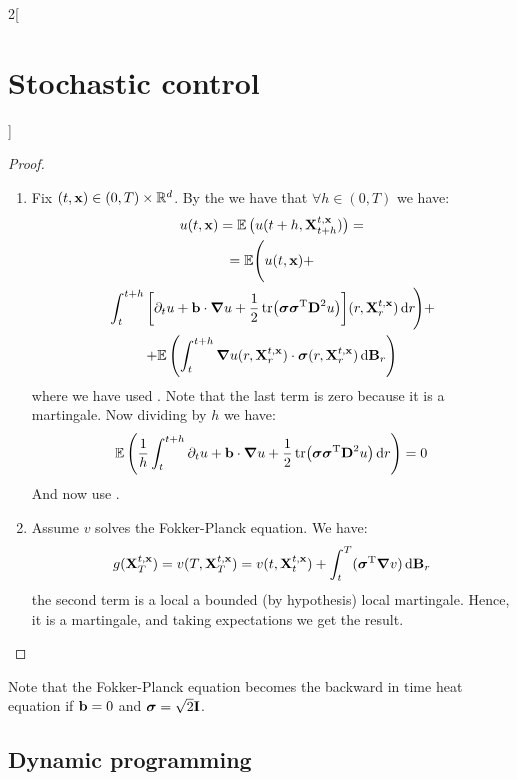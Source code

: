 \documentclass[../../../main_math.tex]{subfiles}
\begin{document}
\begin{multicols}{2}[\section{Stochastic control}]
\begin{proof}
\begin{enumerate}
      \item Fix $(t,\boldsymbol{\mathrm{x}})\in (0,T)\times\mathbb{R}^d$. By the  we have that $\forall h\in (0,T)$ we have:
            \begin{multline*}
              u(t,\boldsymbol{\mathrm{x}})=\mathbb{E}\left(u(t+h,\boldsymbol{\mathrm{X}}_{t+h}^{t,\boldsymbol{\mathrm{x}}})\right)=\\=\mathbb{E}\Bigg(u(t,\boldsymbol{\mathrm{x}})+\\\left.\int_t^{t+h}\left[\partial_t u + \boldsymbol{\mathrm{b}}\cdot\grad u + \frac{1}{2}\tr(\boldsymbol{\mathrm{\sigma}}{\boldsymbol{\mathrm{\sigma}}}^{\mathrm{T}}\boldsymbol{\mathrm{D}}^2u)\right]\!(r,\boldsymbol{\mathrm{X}}_r^{t,\boldsymbol{\mathrm{x}}})\dd{r}\!\right)\!+\\+\mathbb{E}\left(\int_t^{t+h}\grad u(r,\boldsymbol{\mathrm{X}}_r^{t,\boldsymbol{\mathrm{x}}})\cdot\boldsymbol{\mathrm{\sigma}}(r,\boldsymbol{\mathrm{X}}_r^{t,\boldsymbol{\mathrm{x}}})\dd{\boldsymbol{\mathrm{B}}_r}\right)
            \end{multline*}
            where we have used . Note that the last term is zero because it is a martingale. Now dividing by $h$ we have:
            $$
              \mathbb{E}\left(\frac{1}{h}\int_t^{t+h}\partial_t u + \boldsymbol{\mathrm{b}}\cdot\grad u + \frac{1}{2}\tr(\boldsymbol{\mathrm{\sigma}}{\boldsymbol{\mathrm{\sigma}}}^{\mathrm{T}}\boldsymbol{\mathrm{D}}^2u)  \dd{r}\right)=0
            $$
            And now use .
      \item Assume $v$ solves the Fokker-Planck equation. We have:
            \begin{equation*}
              g(\boldsymbol{\mathrm{X}}_T^{t,\boldsymbol{\mathrm{x}}})=v(T,\boldsymbol{\mathrm{X}}_T^{t,\boldsymbol{\mathrm{x}}})=v(t,\boldsymbol{\mathrm{X}}_t^{t,\boldsymbol{\mathrm{x}}})+\int_t^T({\boldsymbol{\mathrm{\sigma}}}^{\mathrm{T}} \grad v) \dd{\boldsymbol{\mathrm{B}}_r}
            \end{equation*}
            the second term is a local a bounded (by hypothesis) local martingale. Hence, it is a martingale, and taking expectations we get the result.
    \end{enumerate}
  \end{proof}
  \begin{remark}
    Note that the Fokker-Planck equation becomes the backward in time heat equation if $\boldsymbol{\mathrm{b}}=0$ and $\boldsymbol{\mathrm{\sigma}}=\sqrt{2}\boldsymbol{\mathrm{I}}$.
  \end{remark}
  \subsection{Dynamic programming}

\end{multicols}
\end{document}
